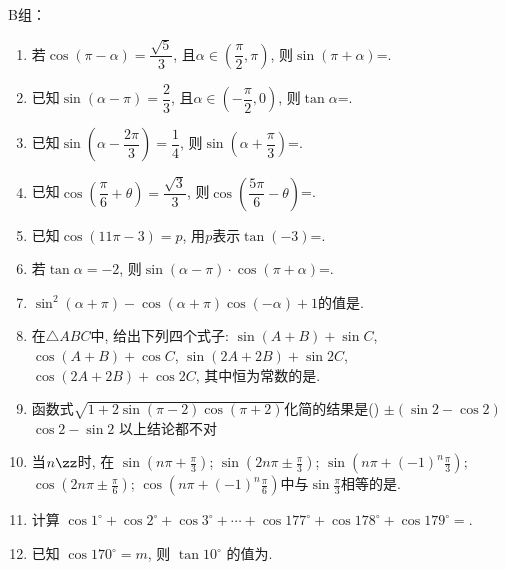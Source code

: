 B组：
\begin{enumerate}
\item 若$\cos(\pi-\alpha)=\dfrac{\sqrt5}{3}$, 且$\alpha\in\left(\dfrac{\pi}{2},\pi\right)$, 则$\sin(\pi+\alpha)$=. 

\item 已知$\sin(\alpha-\pi)=\dfrac{2}{3}$, 且$\alpha\in\left(-\dfrac{\pi}{2},0\right)$, 则$\tan\alpha$=. 

\item 已知$\sin\left(\alpha-\dfrac{2\pi}{3}\right)=\dfrac{1}{4}$, 则$\sin\left(\alpha+\dfrac{\pi}{3}\right)$=. 


\item 已知$\cos\left(\dfrac{\pi}{6}+\theta\right)=\dfrac{\sqrt{3}}{3}$, 则$\cos\left(\dfrac{5\pi}{6}-\theta\right)$=. 

\item 已知$\cos(11\pi-3)=p$, 用$p$表示$\tan(-3)$=.  


\item 若$\tan\alpha=-2$, 则$\sin(\alpha-\pi)\cdot\cos(\pi+\alpha)$=. 

\item $\sin^2(\alpha+\pi)-\cos(\alpha+\pi)\cos(-\alpha)+1$的值是.

\item 在$\triangle{ABC}$中, 给出下列四个式子: 
 $\sin(A+B)+\sin{C}$, 
 $\cos(A+B)+\cos{C}$, 
 $\sin(2A+2B)+\sin2C$, 
 $\cos(2A+2B)+\cos2C$, 其中恒为常数的是.


\item 函数式$\sqrt{1+2\sin(\pi-2)\cos(\pi+2)}$化简的结果是\dotfill()
{$\pm(\sin2-\cos2)$}
{$\cos2-\sin2$}
{以上结论都不对}

\item 当$n\zz$时, 在
 $\sin(n\pi+\frac{\pi}{3})$; 
 $\sin(2n\pi\pm\frac{\pi}{3})$; 
 $\sin(n\pi+(-1)^n\frac{\pi}{3})$; 
 $\cos(2n\pi\pm\frac{\pi}{6})$; 
 $\cos(n\pi+(-1)^n\frac{\pi}{6})$中与$\sin\frac{\pi}{3}$相等的是.


\item 计算 $\cos 1^{\circ}+\cos 2^{\circ}+\cos 3^{\circ}+\cdots+\cos 177^{\circ}+\cos 178^{\circ}+\cos 179^{\circ}=$.

\item 已知 $\cos 170^{\circ}=m$, 则 $\tan 10^{\circ}$ 的值为.



\end{enumerate}
